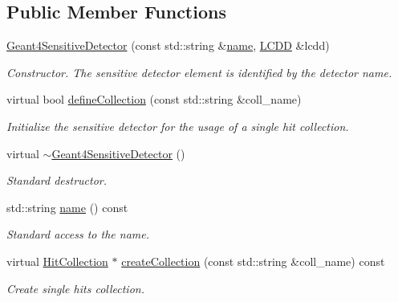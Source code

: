 \subsection*{Public Member Functions}
\begin{DoxyCompactItemize}
\item 
\hyperlink{class_d_d4hep_1_1_simulation_1_1_geant4_sensitive_detector_a5f0a68385e61bdf9434712079302319e}{Geant4\+Sensitive\+Detector} (const std\+::string \&\hyperlink{class_d_d4hep_1_1_simulation_1_1_geant4_sensitive_detector_a55cba2957295dc39988b888d0b5a5127}{name}, \hyperlink{class_d_d4hep_1_1_geometry_1_1_l_c_d_d}{L\+C\+DD} \&lcdd)
\begin{DoxyCompactList}\small\item\em Constructor. The sensitive detector element is identified by the detector name. \end{DoxyCompactList}\item 
virtual bool \hyperlink{class_d_d4hep_1_1_simulation_1_1_geant4_sensitive_detector_a4664d651826df03d0aba6f25a385b862}{define\+Collection} (const std\+::string \&coll\+\_\+name)
\begin{DoxyCompactList}\small\item\em Initialize the sensitive detector for the usage of a single hit collection. \end{DoxyCompactList}\item 
virtual \hyperlink{class_d_d4hep_1_1_simulation_1_1_geant4_sensitive_detector_a15bd6477c7c266c3478c59ac34b2fe31}{$\sim$\+Geant4\+Sensitive\+Detector} ()
\begin{DoxyCompactList}\small\item\em Standard destructor. \end{DoxyCompactList}\item 
std\+::string \hyperlink{class_d_d4hep_1_1_simulation_1_1_geant4_sensitive_detector_a55cba2957295dc39988b888d0b5a5127}{name} () const
\begin{DoxyCompactList}\small\item\em Standard access to the name. \end{DoxyCompactList}\item 
virtual \hyperlink{class_d_d4hep_1_1_simulation_1_1_geant4_sensitive_detector_a4865cf9c96edfef8cd41e309a4cd6211}{Hit\+Collection} $\ast$ \hyperlink{class_d_d4hep_1_1_simulation_1_1_geant4_sensitive_detector_a9373b761f736437a3a7157c3afece920}{create\+Collection} (const std\+::string \&coll\+\_\+name) const
\begin{DoxyCompactList}\small\item\em Create single hits collection. \end{DoxyCompactList}\item 

\end{DoxyCompactItemize}
